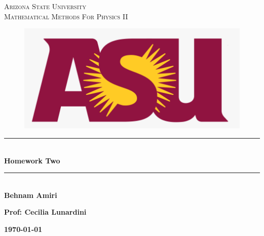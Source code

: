 \documentclass[fleqn]{article}
\begin{document}
  \begin{titlepage}

    \newcommand{\HRule}{\rule{\linewidth}{0.5mm}} %

    \center %



    \textsc{\LARGE Arizona State University}\\[1.5cm] %

    \textsc{\LARGE Mathematical Methods For Physics II }\\[1.5cm] %


    \begin{figure}
      \includegraphics[width=\linewidth]{asu.png}
    \end{figure}


    \HRule \\[0.4cm]
    { \huge \bfseries Homework Two}\\[0.4cm] 
    \HRule \\[1.5cm]

    \textbf{Behnam Amiri}

    \bigbreak

    \textbf{Prof: Cecilia Lunardini}

    \bigbreak


    \textbf{{\large \today}\\[2cm]}

    \vfill %

  \end{titlepage}
\end{document}
